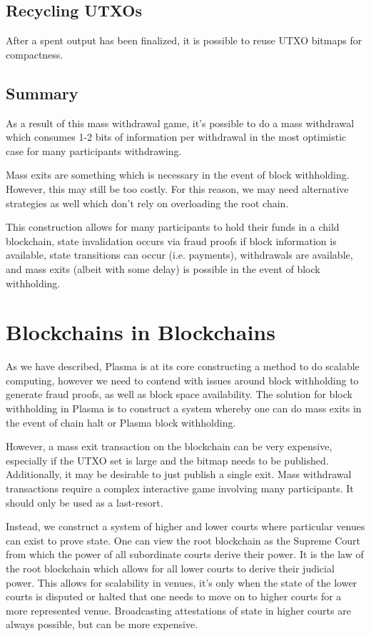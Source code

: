 \documentclass[letterpaper, 11pt]{article}
\begin{document}
\subsection{Recycling UTXOs}

After a spent output has been finalized, it is possible to reuse UTXO bitmaps
for compactness.

\subsection{Summary}

As a result of this mass withdrawal game, it's possible to do a mass withdrawal
which consumes 1-2 bits of information per withdrawal in the most optimistic
case for many participants withdrawing.

Mass exits are something which is necessary in the event of block withholding.
However, this may still be too costly. For this reason, we may need alternative
strategies as well which don't rely on overloading the root chain.

This construction allows for many participants to hold their funds in a child
blockchain, state invalidation occurs via fraud proofs if block information is
available, state transitions can occur (i.e. payments), withdrawals are
available, and mass exits (albeit with some delay) is possible in the event of
block withholding.

\section{Blockchains in Blockchains}

As we have described, Plasma is at its core constructing a method to do scalable
computing, however we need to contend with issues around block withholding to
generate fraud proofs, as well as block space availability. The solution for
block withholding in Plasma is to construct a system whereby one can do mass
exits in the event of chain halt or Plasma block withholding.

However, a mass exit transaction on the blockchain can be very expensive,
especially if the UTXO set is large and the bitmap needs to be published.
Additionally, it may be desirable to just publish a single exit. Mass withdrawal
transactions require a complex interactive game involving many participants. It
should only be used as a last-resort.

Instead, we construct a system of higher and lower courts where particular
venues can exist to prove state. One can view the root blockchain as the Supreme
Court from which the power of all subordinate courts derive their power. It is
the law of the root blockchain which allows for all lower courts to derive
their judicial power. This allows for scalability in venues, it's only when the
state of the lower courts is disputed or halted that one needs to move on to
higher courts for a more represented venue. Broadcasting attestations of state
in higher courts are always possible, but can be more expensive.
\end{document}
